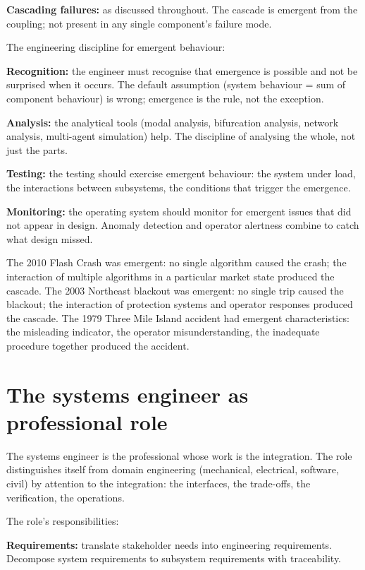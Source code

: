 \textbf{Cascading failures:} as discussed throughout. The cascade is emergent from the coupling; not present in any single component's failure mode.

The engineering discipline for emergent behaviour:

\textbf{Recognition:} the engineer must recognise that emergence is possible and not be surprised when it occurs. The default assumption (system behaviour = sum of component behaviour) is wrong; emergence is the rule, not the exception.

\textbf{Analysis:} the analytical tools (modal analysis, bifurcation analysis, network analysis, multi-agent simulation) help. The discipline of analysing the whole, not just the parts.

\textbf{Testing:} the testing should exercise emergent behaviour: the system under load, the interactions between subsystems, the conditions that trigger the emergence.

\textbf{Monitoring:} the operating system should monitor for emergent issues that did not appear in design. Anomaly detection and operator alertness combine to catch what design missed.

The 2010 Flash Crash was emergent: no single algorithm caused the crash; the interaction of multiple algorithms in a particular market state produced the cascade. The 2003 Northeast blackout was emergent: no single trip caused the blackout; the interaction of protection systems and operator responses produced the cascade. The 1979 Three Mile Island accident had emergent characteristics: the misleading indicator, the operator misunderstanding, the inadequate procedure together produced the accident.

\section{The systems engineer as professional role}

The systems engineer is the professional whose work is the integration. The role distinguishes itself from domain engineering (mechanical, electrical, software, civil) by attention to the integration: the interfaces, the trade-offs, the verification, the operations.

The role's responsibilities:

\textbf{Requirements:} translate stakeholder needs into engineering requirements. Decompose system requirements to subsystem requirements with traceability.

